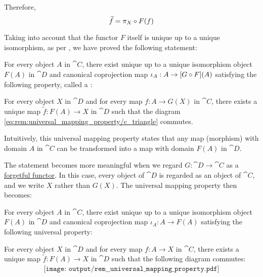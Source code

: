 \begin{remark}
  Therefore,
  \begin{equation*}
    \widetilde{f} = \pi_X \bincirc F(f)
  \end{equation*}

  Taking into account that the functor \( F \) itself is unique up to a unique isomorphism, as per , we have proved the following statement:
  \begin{displayquote}
    For every object \( A \) in \( \cat{C} \), there exist unique up to a unique isomorphism object \( F(A) \) in \( \cat{D} \) and canonical coprojection map \( \iota_A: A \to [G \bincirc F](A) \) satisfying the following property, called a :
    \begin{displayquote}
      For every object \( X \) in \( \cat{D} \) and for every map \( f: A \to G(X) \) in \( \cat{C} \), there exists a unique map \( \widetilde{f}: F(A) \to X \) in \( \cat{D} \) such that the diagram \eqref{eq:rem:universal_mapping_property/c_triangle} commutes.
    \end{displayquote}
  \end{displayquote}

  Intuitively, this universal mapping property states that any map (morphism) with domain \( A \) in \( \cat{C} \) can be transformed into a map with domain \( F(A) \) in \( \cat{D} \).

  The statement becomes more meaningful when we regard \( G: \cat{D} \to \cat{C} \) as a \hyperref[def:concrete_category]{forgetful functor}. In this case, every object of \( \cat{D} \) is regarded as an object of \( \cat{C} \), and we write \( X \) rather than \( G(X) \). The universal mapping property then becomes:
  \begin{displayquote}
    For every object \( A \) in \( \cat{C} \), there exist unique up to a unique isomorphism object \( F(A) \) in \( \cat{D} \) and canonical coprojection map \( \iota_A: A \to F(A) \) satisfying the following universal property:
    \begin{displayquote}
      For every object \( X \) in \( \cat{D} \) and for every map \( f: A \to X \) in \( \cat{C} \), there exists a unique map \( \widetilde{f}: F(A) \to X \) in \( \cat{D} \) such that the following diagram commutes:
      \begin{equation}\label{eq:rem:universal_mapping_property/c_triangle_forgetful}
        \begin{aligned}
          \texttt{[image: output/rem\_\_universal\_mapping\_property.pdf]}
        \end{aligned}
      \end{equation}
    \end{displayquote}
  \end{displayquote}


\end{remark}
